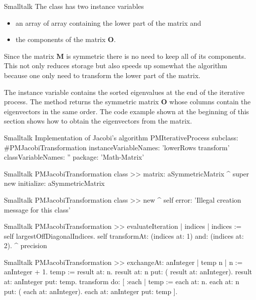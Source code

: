 \begin{displaycode}{Smalltalk}
The class  has two instance variables
\begin{itemize}
  \item {} an array of array containing the lower part
  of the matrix and
  \item {} the components of the matrix $\textbf{O}$.
\end{itemize}
Since the matrix $\textbf{M}$ is symmetric there is no need to keep
all of its components. This not only reduces storage but also
speeds up somewhat the algorithm because one only need to
transform the lower part of the matrix.

The instance variable  contains the sorted eigenvalues
at the end of the iterative process. The method 
returns the symmetric matrix ${\textbf{O}}$ whose columns contain the
eigenvectors in the same order. The code example shown at the
beginning of this section shows how to obtain the eigenvectors
from the matrix.

\begin{listing}[label=lst:jacobi]{Smalltalk}
{Implementation of Jacobi's algorithm}
PMIterativeProcess subclass: #PMJacobiTransformation
   instanceVariableNames: 'lowerRows transform'
   classVariableNames: ''
   package: 'Math-Matrix'
\end{listing}

\begin{displaycode}{Smalltalk}
PMJacobiTransformation class >> matrix: aSymmetricMatrix
    ^ super new initialize: aSymmetricMatrix
\end{displaycode}

\begin{displaycode}{Smalltalk}
PMJacobiTransformation class >> new
    ^ self error: 'Illegal creation message for this class'
\end{displaycode}

\begin{displaycode}{Smalltalk}
PMJacobiTransformation >> evaluateIteration
    | indices |
    indices := self largestOffDiagonalIndices.
    self transformAt: (indices at: 1) and: (indices at: 2).
    ^ precision
\end{displaycode}

\begin{displaycode}{Smalltalk}
PMJacobiTransformation >> exchangeAt: anInteger
    | temp n |
    n := anInteger + 1.
    temp := result at: n.
    result at: n put: ( result at: anInteger).
    result at: anInteger put: temp.
    transform do:
        [ :each |
          temp := each at: n.
          each at: n put: ( each at: anInteger).
          each at: anInteger put: temp ].
\end{displaycode}


\end{displaycode}
